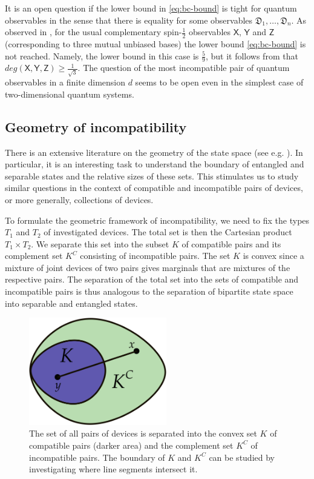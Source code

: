 \documentclass[12pt]{article}
\theoremstyle{definition}
\newcommand{\half}{\tfrac{1}{2}} %
\newcommand{\Dev}{\mathfrak{D}} %
\begin{document}
It is an open question if the lower bound in \eqref{eq:bc-bound} is tight for quantum observables in the sense that there is equality for some observables $\Dev_1,\ldots,\Dev_n$. 
As observed in \cite{DaMaSa01}, for the usual complementary spin-$\half$ observables $\mathsf{X}$, $\mathsf{Y}$ and $\mathsf{Z}$ (corresponding to three mutual unbiased bases) the lower bound \eqref{eq:bc-bound} is not reached.
Namely, the lower bound in this case is $\frac{5}{9}$, but it follows from \cite{Busch86} that
$deg(\mathsf{X},\mathsf{Y},\mathsf{Z}) \geq \frac{1}{\sqrt{3}}$. 
The question of the most incompatible pair of quantum observables in a finite dimension $d$ seems to be open even in the simplest case of two-dimensional quantum systems.

\subsection{Geometry of incompatibility}

There is an extensive literature on the geometry of the state space (see e.g. \cite{GQS06}).
In particular, it is an interesting task to understand the boundary of entangled and separable states and the relative sizes of these sets.
This stimulates us to study similar questions in the context of compatible and incompatible pairs of devices, or more generally, collections of devices.

To formulate the geometric framework of incompatibility, we need to fix the types $T_1$ and $T_2$ of investigated devices.
The total set is then the Cartesian product $T_1\times T_2$.
We separate this set into the subset $K$ of compatible pairs and its complement set $K^C$ consisting of incompatible pairs.
The set $K$ is convex since a mixture of joint devices of two pairs gives marginals that are mixtures of the respective pairs. 
The separation of the total set into the sets of compatible and incompatible pairs is thus analogous to the separation of bipartite state space into separable and entangled states.

\begin{figure}\begin{center}
\includegraphics[width=6cm]{fig_geometry.png}
\caption{The set of all pairs of devices is separated into the convex set $K$ of compatible pairs (darker area) and the complement set $K^C$ of incompatible pairs.
The boundary of $K$ and $K^C$ can be studied by investigating where line segments intersect it.}
\label{fig:geometry}
\end{center}
\end{figure}
\end{document}
